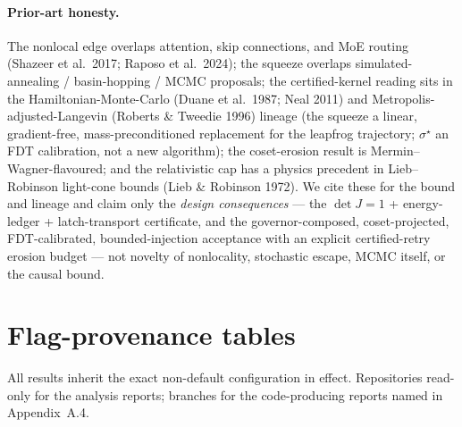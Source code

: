 \documentclass[11pt]{article}
\newcommand{\detJ}{\det J}
\begin{document}
\paragraph{Prior-art honesty.} The nonlocal edge overlaps attention, skip connections, and MoE routing (Shazeer et al.\ 2017; Raposo et al.\ 2024); the squeeze overlaps simulated-annealing / basin-hopping / MCMC proposals; the certified-kernel reading sits in the Hamiltonian-Monte-Carlo (Duane et al.\ 1987; Neal 2011) and Metropolis-adjusted-Langevin (Roberts \& Tweedie 1996) lineage (the squeeze a linear, gradient-free, mass-preconditioned replacement for the leapfrog trajectory; $\sigma^\star$ an FDT calibration, not a new algorithm); the coset-erosion result is Mermin--Wagner-flavoured; and the relativistic cap has a physics precedent in Lieb--Robinson light-cone bounds (Lieb \& Robinson 1972). We cite these for the bound and lineage and claim only the \emph{design consequences} --- the $\detJ=1$ + energy-ledger + latch-transport certificate, and the governor-composed, coset-projected, FDT-calibrated, bounded-injection acceptance with an explicit certified-retry erosion budget --- not novelty of nonlocality, stochastic escape, MCMC itself, or the causal bound.

\appendix
\section{Flag-provenance tables}
All results inherit the exact non-default configuration in effect. Repositories read-only for the analysis reports; branches for the code-producing reports named in Appendix~A.4.
\end{document}
